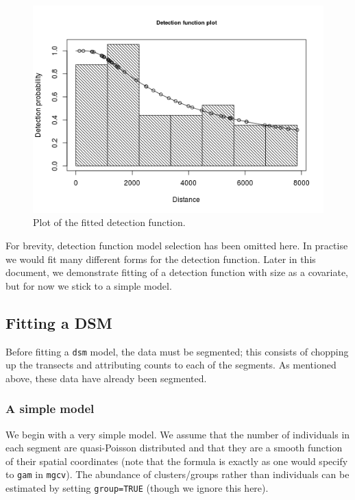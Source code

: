 \documentclass[]{amsart}
\makeatletter
\def\maxwidth{\ifdim\Gin@nat@width>\linewidth\linewidth
\else\Gin@nat@width\fi}
\let\Oldincludegraphics\includegraphics
\renewcommand{\includegraphics}[1]{\Oldincludegraphics[width=\maxwidth]{#1}}
\makeatother
\begin{document}
\begin{figure}[htbp]
\centering
\includegraphics{mexico-figs/hr-detfct.png}
\caption{Plot of the fitted detection function.}
\end{figure}

For brevity, detection function model selection has been omitted here.
In practise we would fit many different forms for the detection
function. Later in this document, we demonstrate fitting of a detection
function with size as a covariate, but for now we stick to a simple
model.

\subsection{Fitting a DSM}

Before fitting a \texttt{dsm} model, the data must be segmented; this
consists of chopping up the transects and attributing counts to each of
the segments. As mentioned above, these data have already been
segmented.

\subsubsection{A simple model}

We begin with a very simple model. We assume that the number of
individuals in each segment are quasi-Poisson distributed and that they
are a smooth function of their spatial coordinates (note that the
formula is exactly as one would specify to \texttt{gam} in
\texttt{mgcv}). The abundance of clusters/groups rather than individuals
can be estimated by setting \texttt{group=TRUE} (though we ignore this
here).
\end{document}
